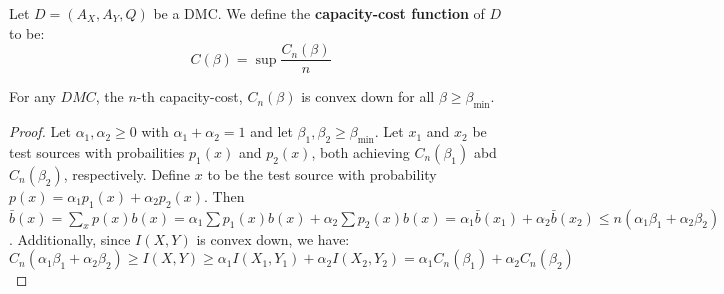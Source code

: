 \begin{definition}
    Let $D=(A_X,A_Y,Q)$ be a DMC. We define the \textbf{capacity-cost function}
    of $D$ to be:
    \begin{equation}
        C(\beta)=\sup{\frac{C_n(\beta)}{n}}
    \end{equation}
\end{definition}

\begin{theorem}\label{3.1.2}
    For any $DMC$, the  $n$-th capacity-cost,  $C_n(\beta)$ is convex down for
    all $\beta \geq \beta_{\min}$.
\end{theorem}
\begin{proof}
    Let $\alpha_1,\alpha_2 \geq 0$ with $\alpha_1+\alpha_2=1$ and let $\beta_1,
    \beta_2 \geq \beta_{\min}$. Let $x_1$ and $x_2$ be test sources with
    probailities $p_1(x)$ and $p_2(x)$, both achieving $C_n(\beta_1)$ abd
    $C_n(\beta_2)$, respectively. Define $x$ to be the test source with
    probability $p(x)=\alpha_1p_1(x)+\alpha_2p_2(x)$. Then
    $\bar{b}(x)=\sum_{x}{p(x)b(x)}=\alpha_1\sum{p_1(x)b(x)}+\alpha_2
    \sum{p_2(x)b(x)}=\alpha_1\bar{b}(x_1)+\alpha_2\bar{b}(x_2) \leq
    n(\alpha_1\beta_1+\alpha_2\beta_2)$. Additionally, since $I(X,Y)$ is convex
    down, we have:
    \begin{equation*}
        C_n(\alpha_1\beta_1+\alpha_2\beta_2) \geq I(X,Y) \geq
        \alpha_1I(X_1,Y_1)+\alpha_2I(X_2,Y_2)=\alpha_1C_n(\beta_1)+\alpha_2C_n(\beta_2)
    \end{equation*}
\end{proof}

